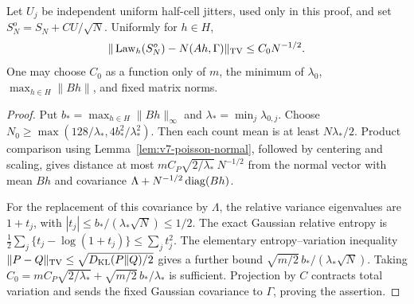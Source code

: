 \begin{lemma}
\label{lem:v7-variance}
Let $U_j$ be independent uniform half-cell jitters, used only in this
proof, and set $S_N^o=S_N+CU/\sqrt N$. Uniformly for $h\in H$,
\begin{equation}
       \|\operatorname{Law}_h(S_N^o)-N(Ah,\Gamma)\|_{\rm TV}
                                  \le C_0N^{-1/2}.    \label{eq:v7-score-normal}
\end{equation}
One may choose $C_0$ as a function only of $m$, the minimum of
$\lambda_0$, $\max_{h\in H}\|Bh\|$, and fixed matrix norms.
\end{lemma}
\begin{proof}
Put $b_* =\max_{h\in H}\|Bh\|_\infty$ and
$\lambda_* =\min_j\lambda_{0,j}$. Choose
$N_0\ge\max(128/\lambda_*,4b_*^2/\lambda_*^2)$.
Then each count mean is at least $N\lambda_*/2$.
Product comparison using Lemma~\ref{lem:v7-poisson-normal}, followed
by centering and scaling, gives distance at most
$mC_P\sqrt{2/\lambda_*}\,N^{-1/2}$ from the normal vector with mean
$Bh$ and covariance $\Lambda+N^{-1/2}\operatorname{diag}(Bh)$.

For the replacement of this covariance by $\Lambda$, the relative
variance eigenvalues are $1+t_j$, with
$|t_j|\le b_*/(\lambda_*\sqrt N)\le1/2$.
The exact Gaussian relative entropy is
$\tfrac12\sum_j\{t_j-\log(1+t_j)\}\le\sum_jt_j^2$.
The elementary entropy--variation inequality
$\|P-Q\|_{\rm TV}\le\sqrt{D_{\rm KL}(P\Vert Q)/2}$ gives a further
bound $\sqrt{m/2}\,b_*/(\lambda_*\sqrt N)$.
Taking
$C_0=mC_P\sqrt{2/\lambda_*}+\sqrt{m/2}\,b_*/\lambda_*$
is sufficient. Projection by $C$ contracts total variation and sends
the fixed Gaussian covariance to $\Gamma$, proving the assertion.
\end{proof}

